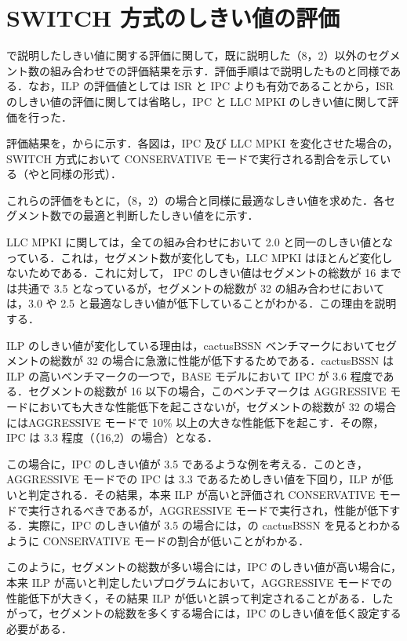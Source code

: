 
\chapter{SWITCH 方式のしきい値の評価}
\label{sec:appendix1}

で説明したしきい値に関する評価に関して，既に説明した（8，2）以外のセグメント数の組み合わせでの評価結果を示す．評価手順はで説明したものと同様である．なお，ILP の評価値としては ISR と IPC よりも有効であることから，ISR のしきい値の評価に関しては省略し，IPC と LLC MPKI のしきい値に関して評価を行った．

評価結果を，からに示す．各図は，IPC 及び  LLC MPKI を変化させた場合の，SWITCH 方式において CONSERVATIVE モードで実行される割合を示している（やと同様の形式）．

これらの評価をもとに，（8，2）の場合と同様に最適なしきい値を求めた．各セグメント数での最適と判断したしきい値をに示す．

LLC MPKI に関しては，全ての組み合わせにおいて 2.0 と同一のしきい値となっている．これは，セグメント数が変化しても，LLC MPKI はほとんど変化しないためである．これに対して， IPC のしきい値はセグメントの総数が 16 までは共通で 3.5 となっているが，セグメントの総数が 32 の組み合わせにおいては，3.0 や 2.5 と最適なしきい値が低下していることがわかる．この理由を説明する．

ILP のしきい値が変化している理由は，cactusBSSN ベンチマークにおいてセグメントの総数が 32 の場合に急激に性能が低下するためである．cactusBSSN は ILP の高いベンチマークの一つで，BASE モデルにおいて IPC が 3.6 程度である．セグメントの総数が 16 以下の場合，このベンチマークは AGGRESSIVE モードにおいても大きな性能低下を起こさないが，セグメントの総数が 32 の場合にはAGGRESSIVE モードで 10\% 以上の大きな性能低下を起こす．その際，IPC は 3.3 程度（（16,2）の場合）となる．

この場合に，IPC のしきい値が 3.5 であるような例を考える．このとき，AGGRESSIVE モードでの IPC は 3.3 であるためしきい値を下回り，ILP が低いと判定される．その結果，本来 ILP が高いと評価され CONSERVATIVE モードで実行されるべきであるが，AGGRESSIVE モードで実行され，性能が低下する．実際に，IPC のしきい値が 3.5 の場合には，の cactusBSSN を見るとわかるように CONSERVATIVE モードの割合が低いことがわかる．

このように，セグメントの総数が多い場合には，IPC のしきい値が高い場合に，本来 ILP が高いと判定したいプログラムにおいて，AGGRESSIVE モードでの性能低下が大きく，その結果 ILP が低いと誤って判定されることがある．したがって，セグメントの総数を多くする場合には，IPC のしきい値を低く設定する必要がある．

